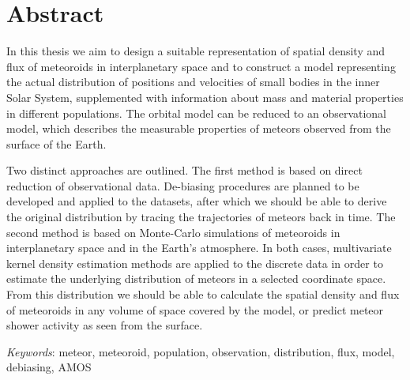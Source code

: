 \section*{Abstract}
    In this thesis we aim to design a suitable representation of spatial density
    and flux of meteoroids in interplanetary space and to construct a model representing
    the actual distribution of positions and velocities of small bodies in the inner Solar System,
    supplemented with information about mass and material properties in different populations.
    The orbital model can be reduced to an observational model,
    which describes the measurable properties of meteors observed from the surface of the Earth.

    Two distinct approaches are outlined.
    The first method is based on direct reduction of observational data.
    De-biasing procedures are planned to be developed and applied to the datasets,
    after which we should be able to derive the original distribution by tracing the trajectories of meteors back in time.
    The second method is based on Monte-Carlo simulations of meteoroids in interplanetary space and in the Earth's atmosphere.
    In both cases, multivariate kernel density estimation methods are applied to the discrete
    data in order to estimate the underlying distribution of meteors in a selected coordinate space.
    From this distribution we should be able to calculate the spatial density and flux of meteoroids
    in any volume of space covered by the model, or predict meteor shower activity as seen from the surface.

    \emph{Keywords}: meteor, meteoroid, population, observation, distribution, flux, model, debiasing, AMOS
